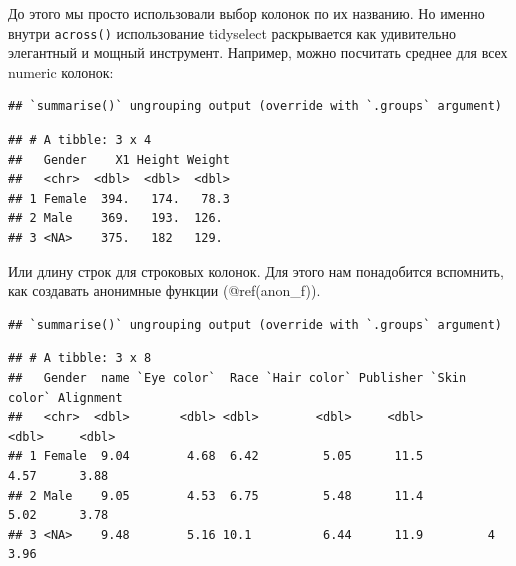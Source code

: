 \documentclass[]{book}
\newenvironment{Shaded}{\begin{snugshade}}{\end{snugshade}}
\newcommand{\KeywordTok}[1]{\textcolor[rgb]{0.13,0.29,0.53}{\textbf{#1}}}
\newcommand{\DataTypeTok}[1]{\textcolor[rgb]{0.13,0.29,0.53}{#1}}
\newcommand{\StringTok}[1]{\textcolor[rgb]{0.31,0.60,0.02}{#1}}
\newcommand{\OtherTok}[1]{\textcolor[rgb]{0.56,0.35,0.01}{#1}}
\newcommand{\ControlFlowTok}[1]{\textcolor[rgb]{0.13,0.29,0.53}{\textbf{#1}}}
\newcommand{\OperatorTok}[1]{\textcolor[rgb]{0.81,0.36,0.00}{\textbf{#1}}}
\newcommand{\NormalTok}[1]{#1}
\begin{document}
До этого мы просто использовали выбор колонок по их названию. Но именно
внутри \texttt{across()} использование tidyselect раскрывается как
удивительно элегантный и мощный инструмент. Например, можно посчитать
среднее для всех numeric колонок:

\begin{Shaded}
\end{Shaded}

\begin{verbatim}
## `summarise()` ungrouping output (override with `.groups` argument)
\end{verbatim}

\begin{verbatim}
## # A tibble: 3 x 4
##   Gender    X1 Height Weight
##   <chr>  <dbl>  <dbl>  <dbl>
## 1 Female  394.   174.   78.3
## 2 Male    369.   193.  126. 
## 3 <NA>    375.   182   129.
\end{verbatim}

Или длину строк для строковых колонок. Для этого нам понадобится
вспомнить, как создавать анонимные функции (@ref(anon\_f)).

\begin{Shaded}
\end{Shaded}

\begin{verbatim}
## `summarise()` ungrouping output (override with `.groups` argument)
\end{verbatim}

\begin{verbatim}
## # A tibble: 3 x 8
##   Gender  name `Eye color`  Race `Hair color` Publisher `Skin color` Alignment
##   <chr>  <dbl>       <dbl> <dbl>        <dbl>     <dbl>        <dbl>     <dbl>
## 1 Female  9.04        4.68  6.42         5.05      11.5         4.57      3.88
## 2 Male    9.05        4.53  6.75         5.48      11.4         5.02      3.78
## 3 <NA>    9.48        5.16 10.1          6.44      11.9         4         3.96
\end{verbatim}
\end{document}
